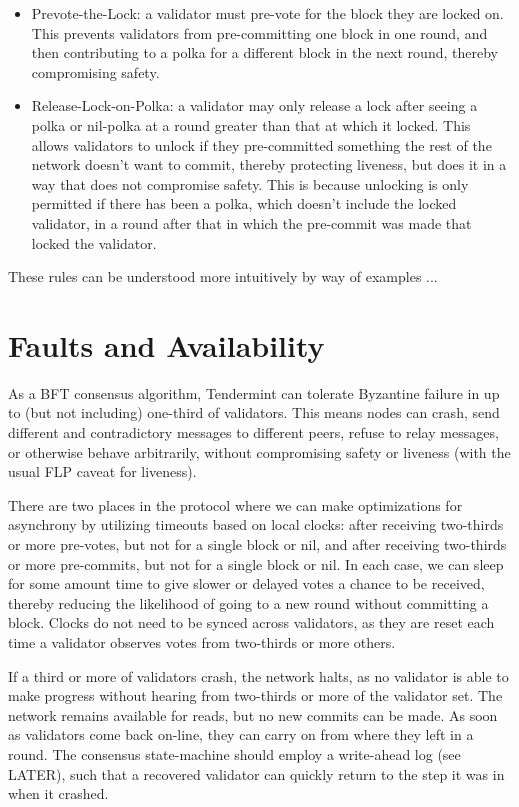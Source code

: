 \begin{itemize}
\item{Prevote-the-Lock: a validator must pre-vote for the block they are locked on. 
	This prevents validators from pre-committing one block in one round, 
	and then contributing to a polka for a different block in the next round, 
	thereby compromising safety.}
\item{Release-Lock-on-Polka: a validator may only release a lock after seeing a polka or nil-polka at a round greater than that at which it locked.
	This allows validators to unlock if they pre-committed something the rest of the network doesn't want to commit,
	thereby protecting liveness, but does it in a way that does not compromise safety.
	This is because unlocking is only permitted if there has been a polka, which doesn't include the locked validator,
	in a round after that in which the pre-commit was made that locked the validator.}
\end{itemize}


These rules can be understood more intuitively by way of examples ...


\section{Faults and Availability}

As a BFT consensus algorithm, Tendermint can tolerate Byzantine failure in up to (but not including) one-third of validators.
This means nodes can crash, send different and contradictory messages to different peers, refuse to relay messages, or otherwise behave arbitrarily,
without compromising safety or liveness (with the usual FLP caveat for liveness).

There are two places in the protocol where we can make optimizations for asynchrony by utilizing timeouts based on local clocks:
after receiving two-thirds or more pre-votes, but not for a single block or nil, and after receiving two-thirds or more pre-commits, 
but not for a single block or nil.
In each case, we can sleep for some amount time to give slower or delayed votes a chance to be received,
thereby reducing the likelihood of going to a new round without committing a block.
Clocks do not need to be synced across validators, as they are reset each time a validator observes votes from two-thirds or more others.

If a third or more of validators crash, the network halts, 
as no validator is able to make progress without hearing from two-thirds or more of the validator set.
The network remains available for reads, but no new commits can be made.
As soon as validators come back on-line, they can carry on from where they left in a round. 
The consensus state-machine should employ a write-ahead log (see LATER),
such that a recovered validator can quickly return to the step it was in when it crashed.

